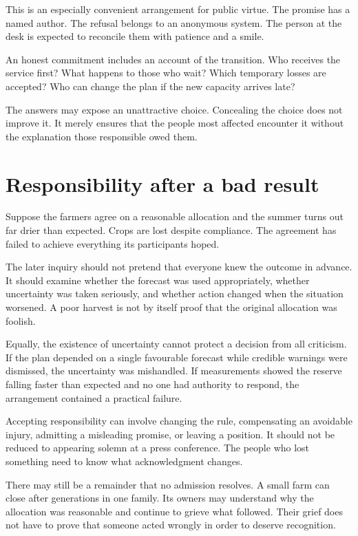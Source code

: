 \documentclass[12pt,a4paper]{book}
\begin{document}
This is an especially convenient arrangement for public virtue. The promise has a named author. The refusal belongs to an anonymous system. The person at the desk is expected to reconcile them with patience and a smile.

An honest commitment includes an account of the transition. Who receives the service first? What happens to those who wait? Which temporary losses are accepted? Who can change the plan if the new capacity arrives late?

The answers may expose an unattractive choice. Concealing the choice does not improve it. It merely ensures that the people most affected encounter it without the explanation those responsible owed them.

\section*{Responsibility after a bad result}

Suppose the farmers agree on a reasonable allocation and the summer turns out far drier than expected. Crops are lost despite compliance. The agreement has failed to achieve everything its participants hoped.

The later inquiry should not pretend that everyone knew the outcome in advance. It should examine whether the forecast was used appropriately, whether uncertainty was taken seriously, and whether action changed when the situation worsened. A poor harvest is not by itself proof that the original allocation was foolish.

Equally, the existence of uncertainty cannot protect a decision from all criticism. If the plan depended on a single favourable forecast while credible warnings were dismissed, the uncertainty was mishandled. If measurements showed the reserve falling faster than expected and no one had authority to respond, the arrangement contained a practical failure.

Accepting responsibility can involve changing the rule, compensating an avoidable injury, admitting a misleading promise, or leaving a position. It should not be reduced to appearing solemn at a press conference. The people who lost something need to know what acknowledgment changes.

There may still be a remainder that no admission resolves. A small farm can close after generations in one family. Its owners may understand why the allocation was reasonable and continue to grieve what followed. Their grief does not have to prove that someone acted wrongly in order to deserve recognition.
\end{document}
